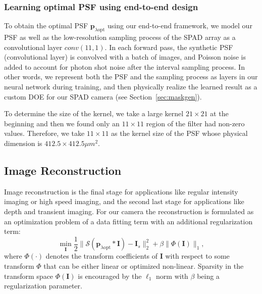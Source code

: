 \subsubsection{Learning optimal PSF using end-to-end design}
To obtain the optimal PSF $\bm{p}_{\lambda \text{opt}}$ using our
end-to-end framework, we model our PSF as well as the low-resolution
sampling process of the SPAD array as a convolutional layer
$conv(11,1)$.
In each forward pass, the synthetic PSF (convolutional layer)
is convolved with a batch of images, and Poisson noise is added to
account for photon shot noise after the interval sampling
process. In other words, we represent both the PSF and the sampling
process as layers in our neural network during training, and then
physically realize the learned result as a custom DOE  for our SPAD
camera (see Section~\ref{sec:maskgen}).

To determine the size of the kernel,
we take a large kernel  $21\times 21$ at the beginning and then we found 
only an $11\times11$ region of the filter had non-zero values. Therefore, 
we take $11\times11$ as the kernel size of the PSF whose physical dimension
is $412.5\times412.5 \mu m^2$.

\subsection{Image Reconstruction}
\label{sec:Reconstruction}

Image reconstruction is the final stage for applications like regular
intensity imaging or high speed imaging, and the second last stage for
applications like depth and transient imaging.  For our camera the
reconstruction is formulated as an optimization problem of a data
fitting term with an additional regularization term:
\begin{equation}\label{eq:costfunction}
\min_{\bm{I}} \frac{1}{2}\| \mathcal{S}(   \bm{p}_{\lambda \text{opt}}*\bm{I}) - \bm{I}_s \|_2^2+ 
\beta\| \Phi(\bm{I}) \|_1,
\end{equation}
where $ \Phi(\cdot)$ denotes the transform coefficients of $\bm{I}$
with respect to some transform $\Phi$ that can be either linear or
optimized non-linear. Sparsity in the transform space
$\Phi(\bm{I})$ is encouraged by the $\ell_1$ norm with $\beta$ being a
regularization parameter.

